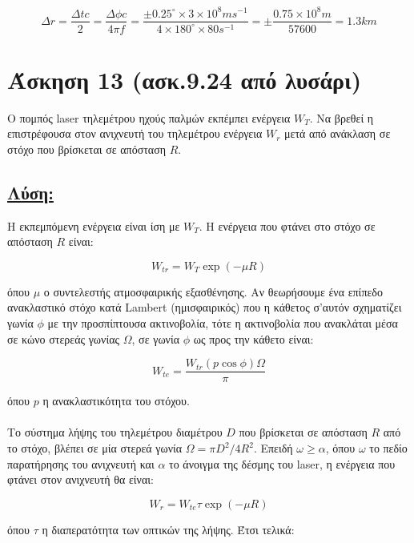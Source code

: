 \documentclass[a4paper,11pt,titlepage]{article}
\newcommand{\degrees}{^{\circ}}
\begin{document}
\begin{equation}
 \Delta r=\frac{\Delta tc}{2}=\frac{\Delta\phi c}{4\pi f}=\frac{\pm 0.25\degrees\times 3\times10^8ms^{-1}}{4\times 180\degrees \times 80s^{-1}}=\pm\frac{0.75\times10^8m}{57600}=1.3km
\end{equation}

\section{Άσκηση 13 (ασκ.9.24 από λυσάρι)}

Ο πομπός laser τηλεμέτρου ηχούς παλμών εκπέμπει ενέργεια $W_T$. Να βρεθεί η επιστρέφουσα στον ανιχνευτή του τηλεμέτρου ενέργεια $W_r$ μετά από ανάκλαση σε στόχο που βρίσκεται σε απόσταση $R$.

\subsection*{\underline{Λύση:}}

Η εκπεμπόμενη ενέργεια είναι ίση με $W_T$.  Η ενέργεια που φτάνει στο στόχο σε απόσταση $R$ είναι:

\begin{equation}
 W_{tr}=W_T\exp(-\mu R)
\end{equation}

όπου $\mu$ ο συντελεστής ατμοσφαιρικής εξασθένησης. Αν θεωρήσουμε ένα επίπεδο ανακλαστικό στόχο κατά Lambert (ημισφαιρικός) που η κάθετος σ'αυτόν σχηματίζει γωνία $\phi$ με την προσπίπτουσα ακτινοβολία, τότε η ακτινοβολία που ανακλάται μέσα σε κώνο στερεάς γωνίας $\Omega$, σε γωνία $\phi$ ως προς την κάθετο είναι:

\begin{equation}
 W_{te}=\frac{W_{tr}(p \cos\phi)\Omega }{\pi}
\end{equation}

όπου $p$ η ανακλαστικότητα του στόχου. \\\\
Το σύστημα λήψης του τηλεμέτρου διαμέτρου $D$ που βρίσκεται σε απόσταση $R$ από το στόχο, βλέπει σε μία στερεά γωνία $\Omega=\pi D^2/4R^2$. Επειδή $\omega\geq \alpha$, όπου $\omega$ το πεδίο παρατήρησης του ανιχνευτή και $\alpha$ το άνοιγμα της δέσμης του laser, η ενέργεια που φτάνει στον ανιχνευτή θα είναι:

\begin{equation}
 W_r=W_{te}\tau\exp(-\mu R)
\end{equation}

όπου $\tau$ η διαπερατότητα των οπτικών της λήψης. Έτσι τελικά:
\end{document}
